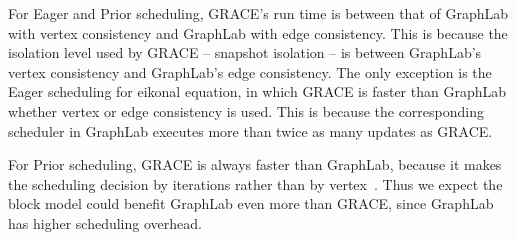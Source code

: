 For Eager and Prior scheduling, GRACE's run time is between that
of GraphLab with vertex consistency and GraphLab with edge consistency.
This is because the isolation level used by GRACE -- snapshot isolation -- is between GraphLab's vertex consistency and GraphLab's edge consistency. 
The only exception is the Eager
scheduling for eikonal equation, in which GRACE is faster than 
GraphLab whether vertex or edge consistency is used.
This is because the corresponding
scheduler in GraphLab 
executes more than twice as many updates as GRACE.

For Prior scheduling, GRACE is always faster than GraphLab, because it
makes the scheduling decision by iterations rather than by
vertex~\cite{Guozhang+13:GRACE}.
Thus we expect the block model 
could benefit GraphLab even more than GRACE, since GraphLab has
higher scheduling overhead.



